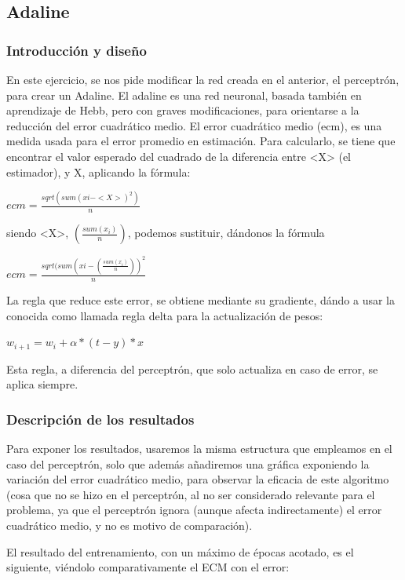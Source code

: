 \documentclass[12pt]{article}
\begin{document}
\subsection{Adaline}

\subsubsection{Introducción y diseño}

En este ejercicio, se nos pide modificar la red creada en el anterior, el perceptrón, para crear un Adaline. El adaline es una red neuronal, basada también en aprendizaje de Hebb, pero con graves modificaciones, para orientarse a la reducción del error cuadrático medio.
El error cuadrático medio (ecm), es una medida usada para el error promedio en estimación. Para calcularlo, se tiene que encontrar el valor esperado del cuadrado de la diferencia entre <X> (el estimador), y X, aplicando la fórmula:

$ecm = \frac{sqrt(sum(xi-<X>)^{2})}{n}$

siendo <X>, $(\frac{sum(x_{i})}{n})$, podemos sustituir, dándonos la fórmula

$ecm = \frac{sqrt(sum(xi-(\frac{sum(x_{i})}{n}))^{2}}{n}$

La regla que reduce este error, se obtiene mediante su gradiente, dándo a usar la conocida como llamada regla delta para la actualización de pesos:

$w_{i+1} = w_{i} + \alpha*(t-y)*x$

Esta regla, a diferencia del perceptrón, que solo actualiza en caso de error, se aplica siempre.

\subsubsection{Descripción de los resultados}

Para exponer los resultados, usaremos la misma estructura que empleamos en el caso del perceptrón, solo que además añadiremos una gráfica exponiendo la variación del error cuadrático medio, para observar la eficacia de este algoritmo (cosa que no se hizo en el perceptrón, al no ser considerado relevante para el problema, ya que el perceptrón ignora (aunque afecta indirectamente) el error cuadrático medio, y no es motivo de comparación).

El resultado del entrenamiento, con un máximo de épocas acotado, es el siguiente, viéndolo comparativamente el ECM con el error:
\end{document}
